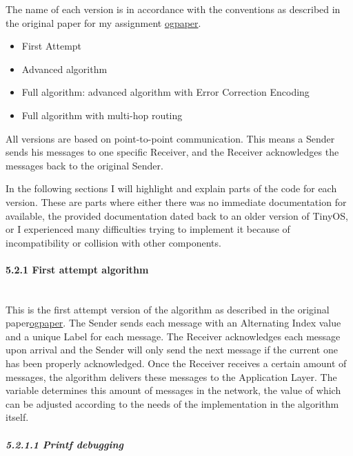 The name of each version is in accordance with the conventions as
described in the original paper for my assignment
\href{http://link.springer.com/chapter/10.1007\%2F978-3-642-33536-5_14}{ogpaper}.

\begin{itemize}
\itemsep1pt\parskip0pt
\item
  First Attempt
\item
  Advanced algorithm
\item
  Full algorithm: advanced algorithm with Error Correction Encoding
\item
  Full algorithm with multi-hop routing
\end{itemize}

All versions are based on point-to-point communication. This means a
Sender sends his messages to one specific Receiver, and the Receiver
acknowledges the messages back to the original Sender.

In the following sections I will highlight and explain parts of the code
for each version. These are parts where either there was no immediate
documentation for available, the provided documentation dated back to an
older version of TinyOS, or I experienced many difficulties trying to
implement it because of incompatibility or collision with other
components.

\paragraph{5.2.1 First attempt
algorithm\\\\}\label{first-attempt-algorithm}

This is the first attempt version of the algorithm as described in the
original
paper\href{http://link.springer.com/chapter/10.1007\%2F978-3-642-33536-5_14}{ogpaper}.
The Sender sends each message with an Alternating Index value and a
unique Label for each message. The Receiver acknowledges each message
upon arrival and the Sender will only send the next message if the
current one has been properly acknowledged. Once the Receiver receives a
certain amount of messages, the algorithm delivers these messages to the
Application Layer. The variable \emph{} determines this amount of
messages in the network, the value of which can be adjusted according to
the needs of the implementation in the algorithm itself.

\subparagraph{5.2.1.1 Printf debugging\\\\}\label{printf-debugging}

